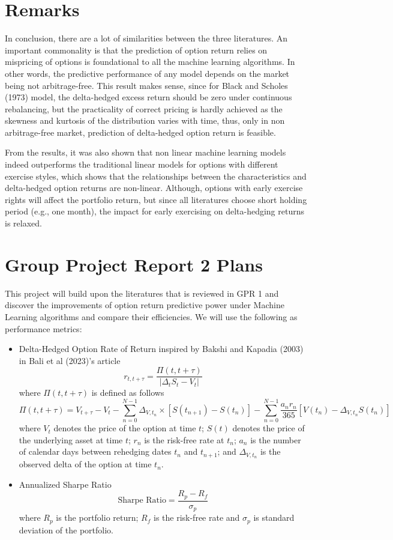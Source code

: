\documentclass[oneside, 12pt]{article}
\newcommand*{\1}{\text{\scalebox{1.1}{\usefont{U}{bbold}{m}{n}1}}}
\begin{document}
\newpage

\section{Remarks}
In conclusion, there are a lot of similarities between the three literatures. An important commonality is that the prediction of option return relies on mispricing of options is foundational to all the machine learning algorithms. In other words, the predictive performance of any model depends on the market being not arbitrage-free. This result makes sense, since for Black and Scholes (1973) model, the delta-hedged excess return should be zero under continuous rebalancing, but the practicality of correct pricing is hardly achieved as the skewness and kurtosis of the distribution varies with time, thus, only in non arbitrage-free market, prediction of delta-hedged option return is feasible.  \newline

From the results, it was also shown that non linear machine learning models indeed outperforms the traditional linear models for options with different exercise styles, which shows that the relationships between the characteristics and delta-hedged option returns are non-linear. Although, options with early exercise rights will affect the portfolio return, but since all literatures choose short holding period (e.g., one month), the impact for early exercising on delta-hedging returns is relaxed. 

\section{Group Project Report 2 Plans}
This project will build upon the literatures that is reviewed in GPR 1 and discover the improvements of option return predictive power under Machine Learning algorithms and compare their efficiencies.  We will use the following as performance metrics:
\begin{itemize}
\item Delta-Hedged Option Rate of Return inspired by Bakshi and Kapadia (2003) in Bali et al (2023)'s article 
$$
r_{t, t + \tau} = \frac{\Pi (t, t + \tau)}{|\Delta_t S_t - V_t|}
$$
where $\Pi(t, t + \tau)$ is defined as follows
$$
\Pi (t, t + \tau) = V_{t + \tau} - V_t - \sum_{n = 0}^{N - 1} \Delta_{V, t_n} \times [S(t_{n + 1}) - S(t_n)] - \sum_{n = 0}^{N - 1} \frac{a_n r_n}{365} [V(t_n) - \Delta_{V, t_n} S(t_n)]
$$
where $V_t$ denotes the price of the option at time $t$; $S(t)$ denotes the price of the underlying asset at time $t$; $r_n$ is the risk-free rate at $t_n$; $a_n$ is the number of calendar days between rehedging dates $t_n$ and $t_{n + 1}$; and $\Delta_{V, t_n}$ is the observed delta of the option at time $t_n$.
\item Annualized Sharpe Ratio
$$
\mathrm{Sharpe \,\, Ratio} = \frac{R_p - R_f}{\sigma_p}
$$
where $R_p$ is the portfolio return; $R_f$ is the risk-free rate and $\sigma_p$ is standard deviation of the portfolio. 
\end{itemize}
\end{document}
